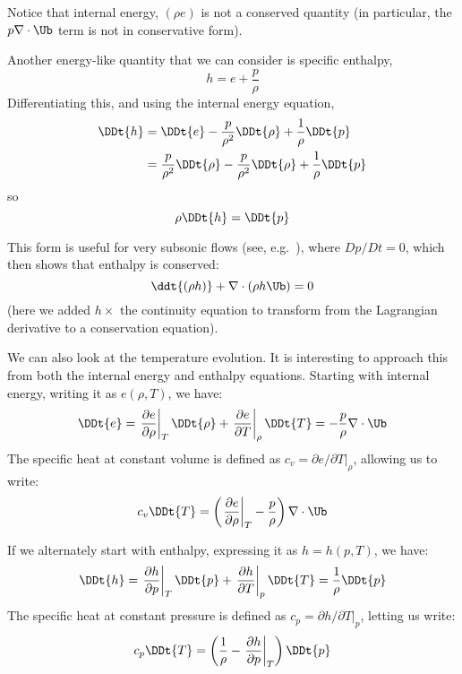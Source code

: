 Notice that internal energy, $(\rho e)$ is not a conserved quantity
(in particular, the $p\nabla \cdot \Ub$ term is not in conservative
form).

Another energy-like quantity that we can consider is specific enthalpy,
\begin{equation}
h = e + \frac{p}{\rho}
\end{equation}
Differentiating this, and using the internal energy equation,
\begin{align}
\DDt{h} &= \DDt{e} - \frac{p}{\rho^2} \DDt{\rho} + \frac{1}{\rho} \DDt{p} \\
        &= \frac{p}{\rho^2}\DDt{\rho} - \frac{p}{\rho^2} \DDt{\rho} + \frac{1}{\rho} \DDt{p}
\end{align}
so
\begin{equation}
\rho \DDt{h} = \DDt{p}
\end{equation}

This form is useful for very subsonic flows (see,
e.g.~\cite{SNpaper}), where $Dp/Dt = 0$, which then shows that
enthalpy is conserved:
\begin{equation}
\ddt{(\rho h)} + \nabla \cdot (\rho h \Ub) = 0
\end{equation}
(here we added $h \times$ the continuity equation to transform from
the Lagrangian derivative to a conservation equation).


We can also look at the temperature evolution.  It is interesting to
approach this from both the internal energy and enthalpy equations.
Starting with internal energy, writing it as $e(\rho, T)$, we have:
\begin{equation}
\DDt{e} = \left . \frac{\partial e}{\partial \rho} \right |_T \DDt{\rho} +
          \left . \frac{\partial e}{\partial T} \right |_\rho \DDt{T} = -\frac{p}{\rho} \nabla \cdot \Ub
\end{equation}
The specific heat at constant volume is defined as $c_v = \partial
e/\partial T|_\rho$, allowing us to write:
\begin{equation}
c_v \DDt{T} = \left ( \left . \frac{\partial e}{\partial \rho} \right |_T - \frac{p}{\rho} \right ) \nabla \cdot \Ub
\end{equation}

If we alternately start with enthalpy, expressing it as $h = h(p, T)$,
we have:
\begin{equation}
\DDt{h} = \left . \frac{\partial h}{\partial p} \right |_T \DDt{p} +
          \left . \frac{\partial h}{\partial T} \right |_p \DDt{T} = \frac{1}{\rho} \DDt{p}
\end{equation}
The specific heat at constant pressure is defined as $c_p = \partial
h/\partial T|_p$, letting us write:
\begin{equation}
c_p \DDt{T} = \left ( \frac{1}{\rho} - \left . \frac{\partial h}{\partial p} \right |_T \right ) \DDt{p}
\end{equation}

